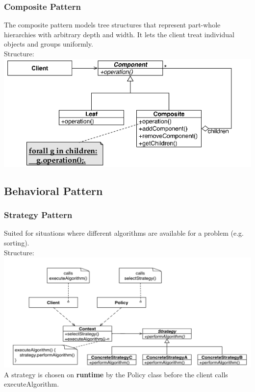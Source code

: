 \subsubsection{Composite Pattern}
The composite pattern models tree structures that represent part-whole hierarchies with arbitrary depth and width.
It lets the client treat individual objects and groups uniformly. \\
Structure:\\
\includegraphics[width=\linewidth]{images/pattern_composite.png}
\newpage


\subsection{Behavioral Pattern}

\subsubsection{Strategy Pattern}
Suited for situations where different algorithms are available for a problem (e.g. sorting).\\
Structure:\\
\includegraphics[width=\linewidth]{images/pattern_strategy.png}
A strategy is chosen on \textbf{runtime} by the Policy class before the client calls executeAlgorithm.
\newpage

